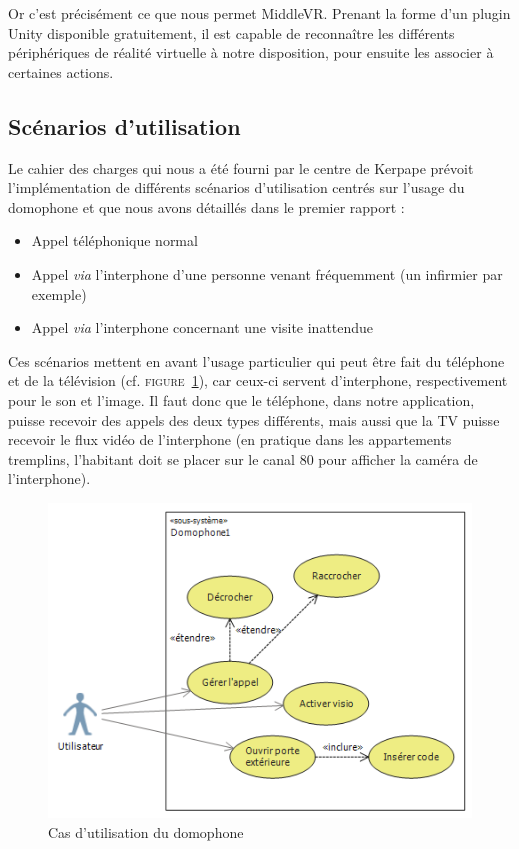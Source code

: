 Or c'est précisément ce que nous permet MiddleVR. Prenant la forme d'un plugin Unity disponible gratuitement, il est capable de reconnaître les différents périphériques de réalité virtuelle à notre disposition, pour ensuite les associer à certaines actions.

\subsection{Scénarios d'utilisation}
Le cahier des charges qui nous a été fourni par le centre de Kerpape prévoit l'implémentation de différents scénarios d'utilisation centrés sur l'usage du domophone et que nous avons détaillés dans le premier rapport :
\begin{itemize}\renewcommand{\labelitemi}{$\bullet$}
\item Appel téléphonique normal
\item Appel \textit{via} l'interphone d'une personne venant fréquemment (un infirmier par exemple)
\item Appel \textit{via} l'interphone concernant une visite inattendue
\end{itemize}
Ces scénarios mettent en avant l'usage particulier qui peut être fait du téléphone et de la télévision (cf. \textsc{figure~\ref{domophone}}), car ceux-ci servent d'interphone, respectivement pour le son et l'image. Il faut donc que le téléphone, dans notre application, puisse recevoir des appels des deux types différents, mais aussi que la TV puisse recevoir le flux vidéo de l'interphone (en pratique dans les appartements tremplins, l'habitant doit se placer sur le canal 80 pour afficher la caméra de l'interphone).
\begin{figure}[h!]
	\begin{center}
  		\caption{Cas d'utilisation du domophone}
  		\label{domophone}
  		\includegraphics[width=\textwidth]{2-Specifications/img-utilisateur/use_case_diag.PNG}
  	\end{center}
\end{figure}

